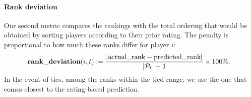 \paragraph{Rank deviation}
Our second metric compares the rankings with the total ordering that would be obtained by sorting players according to their prior rating. The penalty is proportional to how much these ranks differ for player $i$:
\[\mathrm{\bf rank\_deviation}(i,t) := \frac{|\text{actual\_rank} - \text{predicted\_rank}|}{|\mathcal P_t|-1} \times 100\%.\]
In the event of ties, among the ranks within the tied range, we use the one that comes closest to the rating-based prediction.


